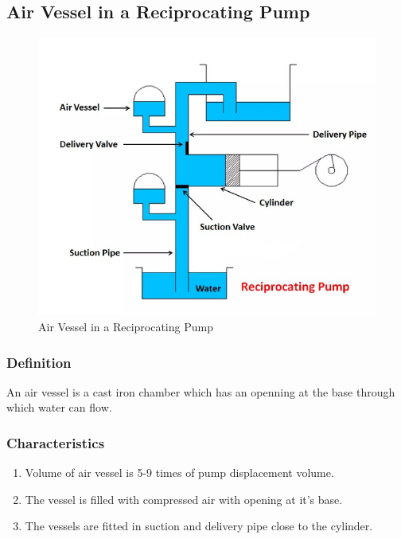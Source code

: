 \documentclass{article}
\begin{document}
  \subsection*{Air Vessel in a Reciprocating Pump}
  \begin{figure}[h]
    \begin{center}
      \includegraphics*[width=0.7\linewidth]{img/air_vessel.jpeg}
      \caption*{Air Vessel in a Reciprocating Pump}
    \end{center}
    \end{figure}

    \subsubsection*{Definition}
    An air vessel is a cast iron chamber which has an openning at the base through which water can flow.

    \subsubsection*{Characteristics}
    \begin{enumerate}
      \item Volume of air vessel is 5-9 times of pump displacement volume. 
      \item The vessel is filled with compressed air with opening at it's base. 
      \item The vessels are fitted in suction and delivery pipe close to the cylinder. 
    \end{enumerate}
\end{document}
